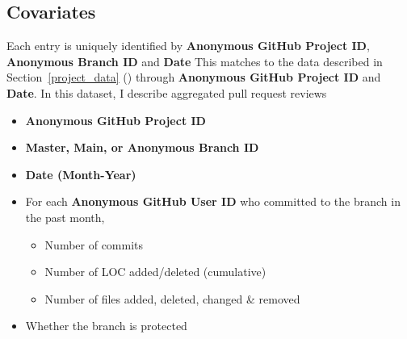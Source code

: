 \documentclass[12pt,notitlepage]{article}
\begin{document}
\subsection*{Covariates}
Each entry is uniquely identified by \textbf{Anonymous GitHub Project ID}, \textbf{Anonymous Branch ID} and \textbf{Date}
This matches to the data described in Section~\ref{project_data} () through \textbf{Anonymous GitHub Project ID} and \textbf{Date}. In this dataset, I describe aggregated pull request reviews
\begin{itemize}
    \item \textbf{Anonymous GitHub Project ID}
    \item \textbf{Master, Main, or Anonymous Branch ID}
    \item \textbf{Date (Month-Year)}
    \item For each \textbf{Anonymous GitHub User ID} who committed to the branch in the past month, 
    \begin{itemize}
        \item Number of commits
        \item Number of LOC added/deleted (cumulative)
        \item Number of files added, deleted, changed \& removed
    \end{itemize}
    \item Whether the branch is protected
\end{itemize}
\end{document}
